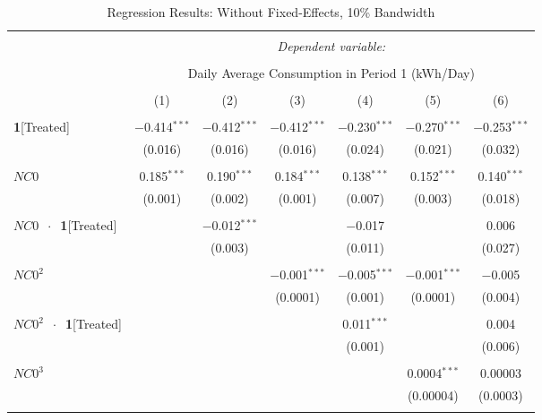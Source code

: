\begin{table}[!htbp]
\centering 
\caption{Regression Results: Without Fixed-Effects, 10\% Bandwidth} 
\label{Table:Regression-Results_Daily-Average_10P-BW-Without-FEs} 
\small
\begin{adjustbox}{scale = 0.8}
\begin{tabular}{@{\extracolsep{25pt}}lcccccc} 
\\[-1.8ex]\hline 
\hline \\[-1.8ex] 
 & \multicolumn{6}{c}{\textit{Dependent variable:}} \\ 
\cline{2-7} 
\\[-1.8ex] & \multicolumn{6}{c}{Daily Average Consumption in Period 1 (kWh/Day)} \\ 
\\[-1.8ex] & (1) & (2) & (3) & (4) & (5) & (6)\\ 
\hline \\[-1.8ex] 
 \textbf{1}[Treated] & $-$0.414$^{***}$ & $-$0.412$^{***}$ & $-$0.412$^{***}$ & $-$0.230$^{***}$ & $-$0.270$^{***}$ & $-$0.253$^{***}$ \\ 
  & (0.016) & (0.016) & (0.016) & (0.024) & (0.021) & (0.032) \\ 
  & & & & & & \\ 
 $NC0$ & 0.185$^{***}$ & 0.190$^{***}$ & 0.184$^{***}$ & 0.138$^{***}$ & 0.152$^{***}$ & 0.140$^{***}$ \\ 
  & (0.001) & (0.002) & (0.001) & (0.007) & (0.003) & (0.018) \\ 
  & & & & & & \\ 
 $NC0$ $\ \cdot \ $ \textbf{1}[Treated] &  & $-$0.012$^{***}$ &  & $-$0.017 &  & 0.006 \\ 
  &  & (0.003) &  & (0.011) &  & (0.027) \\ 
  & & & & & & \\ 
 $NC0^{2}$ &  &  & $-$0.001$^{***}$ & $-$0.005$^{***}$ & $-$0.001$^{***}$ & $-$0.005 \\ 
  &  &  & (0.0001) & (0.001) & (0.0001) & (0.004) \\ 
  & & & & & & \\ 
 $NC0^{2}$ $\ \cdot \ $ \textbf{1}[Treated] &  &  &  & 0.011$^{***}$ &  & 0.004 \\ 
  &  &  &  & (0.001) &  & (0.006) \\ 
  & & & & & & \\ 
 $NC0^{3}$ &  &  &  &  & 0.0004$^{***}$ & 0.00003 \\ 
  &  &  &  &  & (0.00004) & (0.0003) \\ 
  & & & & & & \\ 

\end{tabular}
\end{adjustbox}
\end{table}
